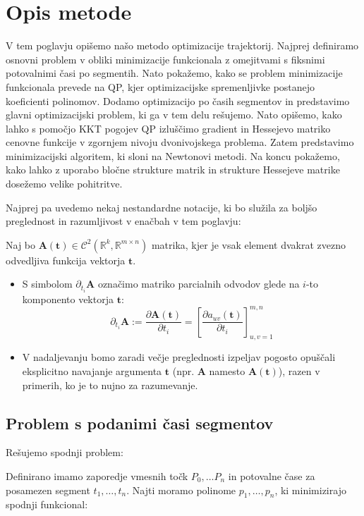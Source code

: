 \documentclass[isrm2, tisk]{fmfdelo}
\begin{document}
\section{Opis metode}
\label{sec:opis_metode}

V tem poglavju opišemo našo metodo optimizacije trajektorij. Najprej definiramo osnovni problem v obliki minimizacije funkcionala z omejitvami s fiksnimi potovalnimi časi po segmentih. Nato pokažemo, kako se problem minimizacije funkcionala prevede na QP, kjer optimizacijske spremenljivke postanejo koeficienti polinomov. Dodamo optimizacijo po časih segmentov in predstavimo glavni optimizacijski problem, ki ga v tem delu rešujemo. Nato opišemo, kako lahko s pomočjo KKT pogojev QP izluščimo gradient in Hessejevo matriko cenovne funkcije v zgornjem nivoju dvonivojskega problema. Zatem predstavimo minimizacijski algoritem, ki sloni na Newtonovi metodi. Na koncu pokažemo, kako lahko z uporabo bločne strukture matrik in strukture Hessejeve matrike dosežemo velike pohitritve. 

Najprej pa uvedemo nekaj nestandardne notacije, ki bo služila za boljšo preglednost in razumljivost v enačbah v tem poglavju:

Naj bo $\mathbf{A}(\mathbf{t}) \in \mathcal{C}^2(\mathbb{R}^k, \mathbb{R}^{m\times n})$ matrika, kjer je vsak element dvakrat zvezno odvedljiva funkcija vektorja $\mathbf{t}$.
\begin{itemize}
    \item S simbolom $\partial_{t_i} \mathbf{A}$ označimo matriko parcialnih odvodov glede na $i$-to komponento vektorja $\mathbf{t}$:
    \begin{equation} \partial_{t_i} \mathbf{A} := \frac{\partial \mathbf{A}(\mathbf{t})}{\partial t_i} = \left[ \frac{\partial a_{uv}(\mathbf{t})}{\partial t_i} \right]_{u,v=1}^{m,n} \end{equation}
    \item V nadaljevanju bomo zaradi večje preglednosti izpeljav pogosto opuščali eksplicitno navajanje argumenta $\mathbf{t}$ (npr. $\mathbf{A}$ namesto $\mathbf{A}(\mathbf{t})$), razen v primerih, ko je to nujno za razumevanje.
\end{itemize}


\subsection{Problem s podanimi časi segmentov}
Rešujemo spodnji problem:

Definirano imamo zaporedje vmesnih točk $P_0, \ldots P_n$ in potovalne čase za posamezen segment $t_1, \ldots, t_n$. Najti moramo polinome $p_1, \ldots, p_n$, ki minimizirajo spodnji funkcional:
\end{document}
